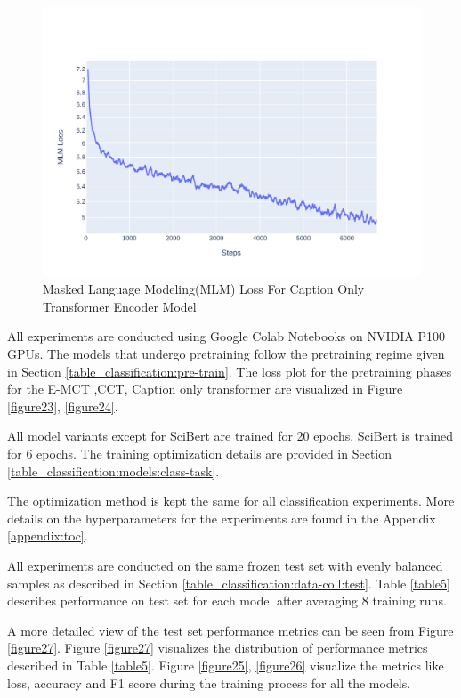 \begin{figure}[h]
    \centering
    \includegraphics[width=0.8\maxwidth{\textwidth}]{src/images/mlm-loss-comparison-caption.pdf}
    \caption{Masked Language Modeling(MLM) Loss For Caption Only Transformer Encoder Model }
    \label{figure\arabic{figurecounter}}
\end{figure}
\FloatBarrier
All experiments are conducted using Google Colab Notebooks on NVIDIA P100 GPUs. The models that undergo pretraining follow the pretraining regime given in Section \ref{table_classification:pre-train}. The loss plot for the pretraining phases for the E-MCT ,CCT, Caption only transformer are visualized in Figure \ref{figure23}, \ref{figure24}. 

All model variants except for SciBert are trained for 20 epochs. SciBert is trained for 6 epochs. The training optimization details are provided in Section \ref{table_classification:models:class-task}. 

The optimization method is kept the same for all classification experiments.  More details on the hyperparameters for the experiments are found in the Appendix \ref{appendix:toc}.  

All experiments are conducted on the same frozen test set with evenly balanced samples as described in Section \ref{table_classification:data-coll:test}. Table \ref{table5} describes performance on test set for each model after averaging 8 training runs. 

A more detailed view of the test set performance metrics can be seen from Figure \ref{figure27}.  Figure \ref{figure27} visualizes the distribution of performance metrics described in Table \ref{table5}. Figure \ref{figure25}, \ref{figure26} visualize the metrics like loss, accuracy and F1 score during the training process for all the models. 

